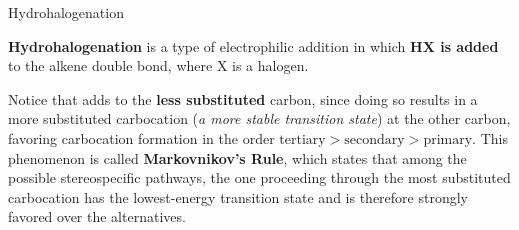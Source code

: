 \documentclass[10pt]{article}
\begin{document}
      \begin{core}[label=core:hydrohalogenation]{Hydrohalogenation}
  
        \textbf{Hydrohalogenation} is a type of electrophilic addition in which \textbf{HX is added} to the alkene double bond, where X is a halogen.


        Notice that  adds to the \textbf{less substituted} carbon, since doing so results in a more substituted carbocation (\textit{a more stable transition state}) at the other carbon, favoring carbocation formation in the order $\text{tertiary} > \text{secondary} > \text{primary}$. This phenomenon is called \textbf{Markovnikov's Rule}, which states that among the possible stereospecific pathways, the one proceeding through the most substituted carbocation has the lowest-energy transition state and is therefore strongly favored over the alternatives.

      \end{core}
\end{document}
